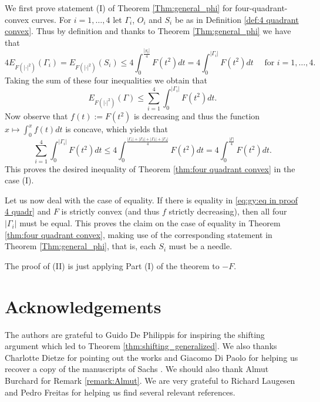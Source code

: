\documentclass[10pt,leqno]{amsart}
\makeatletter
\numberwithin{Theorem}{section}
\theoremstyle{definition}
\theoremstyle{remark}
\numberwithin{equation}{section}
\numberwithin{equation}{section}
\newenvironment{customproof}[1]{%
  \par\pushQED{\qed}%
  \normalfont\topsep6pt \trivlist
  \item[\hskip\labelsep\itshape
    Proof of #1\@addpunct{.}]\ignorespaces
}{%
  \popQED\endtrivlist\@endpefalse
}
\makeatother
\begin{document}
\begin{customproof}{Theorem \ref{thm:four quadrant convex}}
We first prove statement (I) of Theorem \ref{Thm:general_phi} for four-quadrant-convex curves. For $i=1,\ldots,4$ let $\Gamma_i$, $O_i$ and $S_i$ be as in Definition \ref{def:4 quadrant convex}. Thus by definition and thanks to Theorem \ref{Thm:general_phi} we have that
$$
  4 E_{F(|\cdot|^2)}(\Gamma_i) =E_{F(|\cdot|^2)}(S_i) 
  \leq 4\int_0^{\frac{|S_i|}{4}}F(t^2)dt=4\int_0^{|\Gamma_i|}F(t^2)dt
  \quad\text{ for $i=1,\ldots,4$.}
$$
Taking the sum of these four inequalities we obtain that 
$$
  E_{F(|\cdot|^2)}(\Gamma)\leq \sum_{i=1}^4\int_0^{|\Gamma_i|}F(t^2)dt.
$$
Now observe that $f(t):=F(t^2)$ is decreasing and thus the function $x\mapsto \int_0^x f(t)dt$ is concave, which yields that
\begin{equation}\label{eq:gy:eq in proof 4 quadr}
  \sum_{i=1}^4\int_0^{|\Gamma_i|}F(t^2)dt\leq 4 \int_0^{\frac{|\Gamma_1|+|\Gamma_2|+|\Gamma_3|+|\Gamma_4|}{4}}F(t^2)dt=
  4\int_0^{\frac{|\Gamma|}{4}}F(t^2)dt.
\end{equation}
This proves the desired inequality of Theorem \ref{thm:four quadrant convex} in the case (I).

Let us now deal with the case of equality. If there is equality in \eqref{eq:gy:eq in proof 4 quadr} and $F$ is strictly convex (and thus $f$ strictly decreasing), then all four $|\Gamma_i|$ must be equal. This proves the claim on the case of equality in Theorem \ref{thm:four quadrant convex}, making use of the corresponding statement in Theorem \ref{Thm:general_phi}, that is, each $S_i$ must be a needle. 

The proof of  (II) is just applying Part (I) of the theorem to $-F.$ 
\end{customproof}



\section*{Acknowledgements}
The authors are grateful to Guido De Philippis for inspiring the shifting argument which led to Theorem \ref{thm:shifting_generalized}. We also thanks Charlotte Dietze for pointing out the works \cite{Charlotte2024,Hurwitz1902} and Giacomo Di Paolo for helping us recover a copy of the manuscripts of Sachs \cite{SachsIandII,SachsIII,SachsIV,SachsV}.
We should also thank Almut Burchard for Remark \ref{remark:Almut}. We are very grateful to Richard Laugesen and Pedro Freitas for helping us find several relevant references. 




\end{document}
